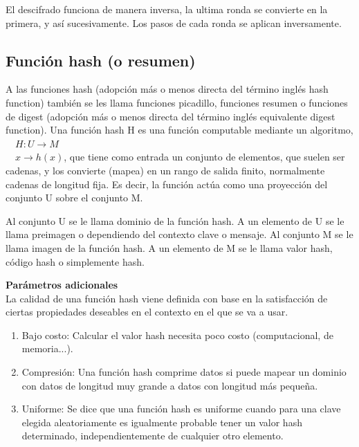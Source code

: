 \documentclass[spanish]{article}
\begin{document}
El descifrado funciona de manera inversa, la ultima ronda se convierte  en la primera, y así sucesivamente. Los pasos de cada ronda se aplican inversamente.


\subsection{Función hash (o resumen)}
A las funciones hash (adopción más o menos directa del término inglés hash function) también se les llama funciones picadillo, funciones resumen o funciones de digest (adopción más o menos directa del término inglés equivalente digest function). Una función hash H es una función computable mediante un algoritmo,
 $H: U \rightarrow  M$\\
 $x \rightarrow  h\left(x\right) $,
que tiene como entrada un conjunto de elementos, que suelen ser cadenas, y los convierte (mapea) en un rango de salida finito, normalmente cadenas de longitud fija. Es decir, la función actúa como una proyección del conjunto U sobre el conjunto M.

Al conjunto U se le llama dominio de la función hash. A un elemento de U se le llama preimagen o dependiendo del contexto clave o mensaje.
Al conjunto M se le llama imagen de la función hash. A un elemento de M se le llama valor hash, código hash o simplemente hash.

\textbf{Parámetros adicionales}\\

La calidad de una función hash viene definida con base en la satisfacción de ciertas propiedades deseables en el contexto en el que se va a usar.

\begin{enumerate}
\item Bajo costo: Calcular el valor hash necesita poco costo (computacional, de memoria...). 
\item Compresión: Una función hash comprime datos si puede mapear un dominio con datos de longitud muy grande a datos con longitud más pequeña.
\item Uniforme: Se dice que una función hash es uniforme cuando para una clave elegida aleatoriamente es igualmente probable tener un valor hash determinado, independientemente de cualquier otro elemento.
\end{enumerate}
\end{document}
